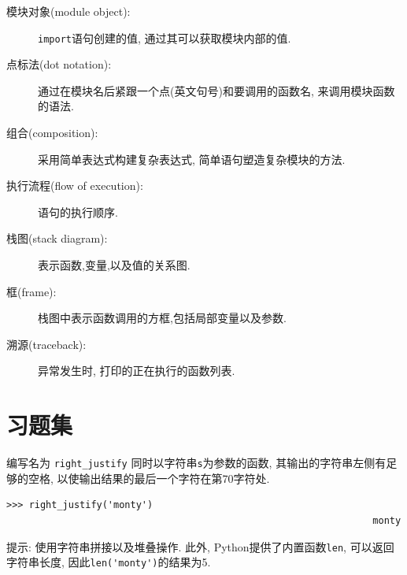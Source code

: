 \documentclass[10pt]{book}
\begin{document}
\begin{description}
\item[模块对象(module object):] {\tt import}语句创建的值, 通过其可以获取模块内部的值. 

\item[点标法(dot notation):] 通过在模块名后紧跟一个点(英文句号)和要调用的函数名, 
来调用模块函数的语法. 

\item[组合(composition):] 采用简单表达式构建复杂表达式, 简单语句塑造复杂模块的方法. 

\item[执行流程(flow of execution):] 语句的执行顺序.

\item[栈图(stack diagram):] 表示函数,变量,以及值的关系图. 

\item[框(frame):] 栈图中表示函数调用的方框,包括局部变量以及参数. 

\item[溯源(traceback):] 异常发生时, 打印的正在执行的函数列表. 


\end{description}


\section{习题集}

\begin{exercise}

编写名为 \verb"right_justify" 同时以字符串{\tt s}为参数的函数, 
其输出的字符串左侧有足够的空格, 以使输出结果的最后一个字符在第70字符处. 

\begin{verbatim}
>>> right_justify('monty')
                                                                 monty
\end{verbatim}

提示: 使用字符串拼接以及堆叠操作. 此外, Python提供了内置函数{\tt len}, 可以返回字符串长度, 
因此\verb"len('monty')"的结果为5.

\end{exercise}
\end{document}
